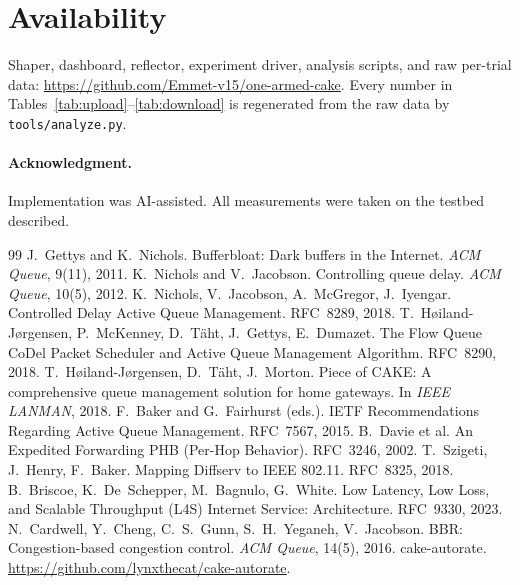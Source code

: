 \documentclass[10pt,twocolumn]{article}
\begin{document}
\section{Availability}
Shaper, dashboard, reflector, experiment driver, analysis scripts, and raw
per-trial data: \url{https://github.com/Emmet-v15/one-armed-cake}. Every number
in Tables~\ref{tab:upload}--\ref{tab:download} is regenerated from the raw data
by \texttt{tools/analyze.py}.

\paragraph{Acknowledgment.} Implementation was AI-assisted. All measurements
were taken on the testbed described.

\begin{thebibliography}{99}\small
{} J.~Gettys and K.~Nichols. Bufferbloat: Dark buffers in the
  Internet. \emph{ACM Queue}, 9(11), 2011.
 K.~Nichols and V.~Jacobson. Controlling queue delay.
  \emph{ACM Queue}, 10(5), 2012.
 K.~Nichols, V.~Jacobson, A.~McGregor, J.~Iyengar. Controlled
  Delay Active Queue Management. RFC~8289, 2018.
 T.~H{\o}iland-J{\o}rgensen, P.~McKenney, D.~T{\"a}ht,
  J.~Gettys, E.~Dumazet. The Flow Queue CoDel Packet Scheduler and Active Queue
  Management Algorithm. RFC~8290, 2018.
 T.~H{\o}iland-J{\o}rgensen, D.~T{\"a}ht, J.~Morton. Piece of
  CAKE: A comprehensive queue management solution for home gateways. In
  \emph{IEEE LANMAN}, 2018.
 F.~Baker and G.~Fairhurst (eds.). IETF Recommendations
  Regarding Active Queue Management. RFC~7567, 2015.
 B.~Davie et al. An Expedited Forwarding PHB (Per-Hop
  Behavior). RFC~3246, 2002.
 T.~Szigeti, J.~Henry, F.~Baker. Mapping Diffserv to IEEE
  802.11. RFC~8325, 2018.
 B.~Briscoe, K.~De~Schepper, M.~Bagnulo, G.~White. Low Latency,
  Low Loss, and Scalable Throughput (L4S) Internet Service: Architecture.
  RFC~9330, 2023.
 N.~Cardwell, Y.~Cheng, C.~S.~Gunn, S.~H.~Yeganeh, V.~Jacobson.
  BBR: Congestion-based congestion control. \emph{ACM Queue}, 14(5), 2016.
 cake-autorate.
  \url{https://github.com/lynxthecat/cake-autorate}.
\end{thebibliography}
\end{document}
